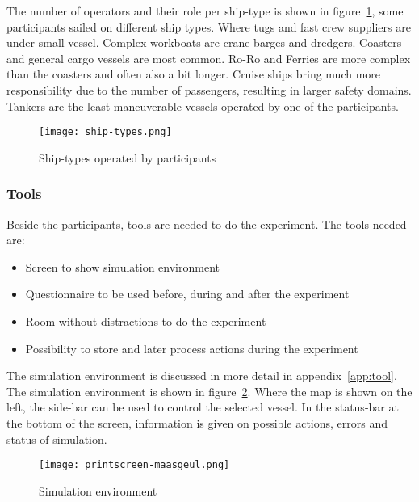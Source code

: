 The number of operators and their role per ship-type is shown in figure~\ref{fig:ship-types}, some participants sailed on different ship types. Where tugs and fast crew suppliers are under small vessel. Complex workboats are crane barges and dredgers. Coasters and general cargo vessels are most common. Ro-Ro and Ferries are more complex than the coasters and often also a bit longer. Cruise ships bring much more responsibility due to the number of passengers, resulting in larger safety domains. Tankers are the least maneuverable vessels operated by one of the participants.

\begin{figure}[p]
	\centering
	\texttt{[image: ship-types.png]}
	\caption{Ship-types operated by participants}
	\label{fig:ship-types}
\end{figure}

\subsubsection{Tools}
Beside the participants, tools are needed to do the experiment. The tools needed are:
\begin{spacing}{1}
\begin{itemize}
	\item Screen to show simulation environment
	\item Questionnaire to be used before, during and after the experiment
	\item Room without distractions to do the experiment
	\item Possibility to store and later process actions during the experiment
\end{itemize}
\end{spacing}

The simulation environment is discussed in more detail in appendix~\ref{app:tool}. The simulation environment is shown in figure~\ref{fig:printscreen-tool}. Where the map is shown on the left, the side-bar can be used to control the selected vessel. In the status-bar at the bottom of the screen, information is given on possible actions, errors and status of simulation.

\begin{figure}[p]
	\centering
	\texttt{[image: printscreen-maasgeul.png]}
	\caption{Simulation environment}
	\label{fig:printscreen-tool}
\end{figure}

